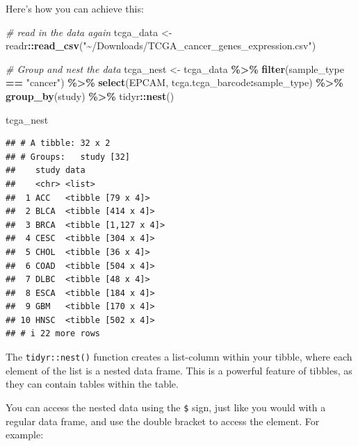 \documentclass[
]{book}
\newenvironment{Shaded}{\begin{snugshade}}{\end{snugshade}}
\newcommand{\CommentTok}[1]{\textcolor[rgb]{0.56,0.35,0.01}{\textit{#1}}}
\newcommand{\DecValTok}[1]{\textcolor[rgb]{0.00,0.00,0.81}{#1}}
\newcommand{\FunctionTok}[1]{\textcolor[rgb]{0.13,0.29,0.53}{\textbf{#1}}}
\newcommand{\NormalTok}[1]{#1}
\newcommand{\OtherTok}[1]{\textcolor[rgb]{0.56,0.35,0.01}{#1}}
\newcommand{\SpecialCharTok}[1]{\textcolor[rgb]{0.81,0.36,0.00}{\textbf{#1}}}
\newcommand{\StringTok}[1]{\textcolor[rgb]{0.31,0.60,0.02}{#1}}
\begin{document}
Here's how you can achieve this:

\begin{Shaded}
\begin{Highlighting}[]
\CommentTok{\# read in the data again}
\NormalTok{tcga\_data }\OtherTok{\textless{}{-}}\NormalTok{ readr}\SpecialCharTok{::}\FunctionTok{read\_csv}\NormalTok{(}\StringTok{"\textasciitilde{}/Downloads/TCGA\_cancer\_genes\_expression.csv"}\NormalTok{)}

\CommentTok{\# Group and nest the data}
\NormalTok{tcga\_nest }\OtherTok{\textless{}{-}}\NormalTok{ tcga\_data }\SpecialCharTok{\%\textgreater{}\%}
  \FunctionTok{filter}\NormalTok{(sample\_type }\SpecialCharTok{==} \StringTok{"cancer"}\NormalTok{) }\SpecialCharTok{\%\textgreater{}\%}
  \FunctionTok{select}\NormalTok{(EPCAM, tcga.tcga\_barcode}\SpecialCharTok{:}\NormalTok{sample\_type) }\SpecialCharTok{\%\textgreater{}\%}
  \FunctionTok{group\_by}\NormalTok{(study) }\SpecialCharTok{\%\textgreater{}\%}
\NormalTok{  tidyr}\SpecialCharTok{::}\FunctionTok{nest}\NormalTok{()}

\NormalTok{tcga\_nest}
\end{Highlighting}
\end{Shaded}

\begin{verbatim}
## # A tibble: 32 x 2
## # Groups:   study [32]
##    study data                
##    <chr> <list>              
##  1 ACC   <tibble [79 x 4]>   
##  2 BLCA  <tibble [414 x 4]>  
##  3 BRCA  <tibble [1,127 x 4]>
##  4 CESC  <tibble [304 x 4]>  
##  5 CHOL  <tibble [36 x 4]>   
##  6 COAD  <tibble [504 x 4]>  
##  7 DLBC  <tibble [48 x 4]>   
##  8 ESCA  <tibble [184 x 4]>  
##  9 GBM   <tibble [170 x 4]>  
## 10 HNSC  <tibble [502 x 4]>  
## # i 22 more rows
\end{verbatim}

The \texttt{tidyr::nest()} function creates a list-column within your tibble, where each element of the list is a nested data frame. This is a powerful feature of tibbles, as they can contain tables within the table.

You can access the nested data using the \texttt{\$} sign, just like you would with a regular data frame, and use the double bracket to access the element. For example:

\begin{Shaded}
\end{Shaded}
\end{document}
